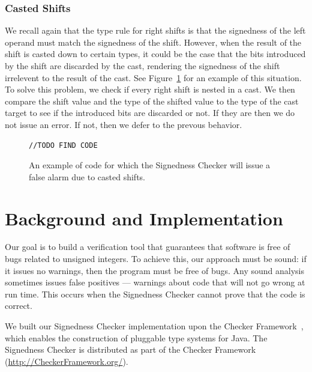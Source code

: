 \subsubsection{Casted Shifts}
We recall again that the type rule for right shifts is that the signedness
of the left
operand must match the signedness of the shift. However, when the result of the
shift is casted down to certain types, it could be the case that the bits
introduced by the shift are discarded by the cast, rendering the signedness of
the shift irrelevent to the result of the cast.
See Figure~\ref{fig:castedshift} for an example of this situation. To solve this
problem, we check if every right shift is nested in a cast. We then compare the
shift value and the type of the shifted value to the type of the cast target
to see if the introduced bits are discarded or not. If they are then we do not
issue an error. If not, then we defer to the prevous behavior.

\begin{figure}[t]
\begin{lstlisting}
//TODO FIND CODE
\end{lstlisting}
\vspace{-10pt}
\caption{An example of code for which the Signedness Checker will issue a false
alarm due to casted shifts.}
\label{fig:castedshift}
\end{figure}

\section{Background and Implementation}

Our goal is to build a verification tool that guarantees that software is
free of bugs related to unsigned integers. To achieve this, our approach
must be sound:  if it issues no warnings, then the program must be free of
bugs.
Any sound analysis sometimes issues false positives --- warnings about
code that will not go wrong at run time.  This occurs when the
Signedness Checker cannot prove that the code is correct.

We built our Signedness Checker implementation upon the
Checker Framework~\cite{PapiACPE2008,DietlDEMS2011}, which enables the
construction of pluggable type systems for Java.
The Signedness Checker is distributed as part of the Checker Framework
(\url{http://CheckerFramework.org/}).


